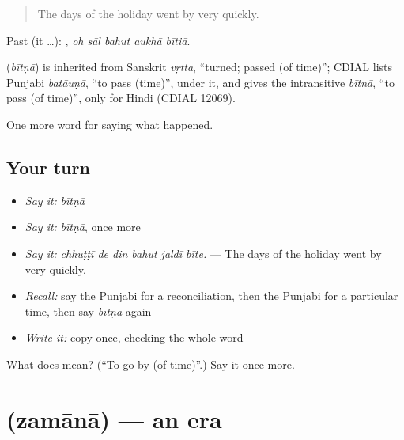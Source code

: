 \begin{quote}
The days of the holiday went by very quickly.
\end{quote}

Past (it …):     , \emph{oh sāl bahut aukhā bītiā}.

\begin{cousinweb}
\textbf{} (\emph{bītṇā}) is inherited from Sanskrit \emph{vṛtta}, \textquotedblleft{}turned; passed (of time)\textquotedblright{}; CDIAL lists Punjabi \emph{batāuṇā}, \textquotedblleft{}to pass (time)\textquotedblright{}, under it, and gives the intransitive \emph{bītnā}, \textquotedblleft{}to pass (of time)\textquotedblright{}, only for Hindi (CDIAL 12069).
\end{cousinweb}

\begin{grammarlens}[title={What you've built}]
One more word for saying what happened.
\end{grammarlens}

\subsection*{Your turn}
\begin{itemize}
\raggedright
  \item \emph{Say it:} \emph{bītṇā}
  \item \emph{Say it:} \emph{bītṇā}, once more
  \item \emph{Say it:} \emph{chhuṭṭī de din bahut jaldī bīte.} — The days of the holiday went by very quickly.
  \item \emph{Recall:} say the Punjabi for a reconciliation, then the Punjabi for a particular time, then say \emph{bītṇā} again
  \item \emph{Write it:} copy \textbf{} once, checking the whole word
\end{itemize}

\begin{tcolorbox}[breakable,colback=teal!4,colframe=teal!35!black,title={Before you move on}]
What does  mean? (\textquotedblleft{}To go by (of time)\textquotedblright{}.) Say it once more.
\end{tcolorbox}
\section[\texorpdfstring{\pa{ਜ਼ਮਾਨਾ} (zamānā)}{ਜ਼ਮਾਨਾ (zamānā)}]{ (zamānā) — an era}


